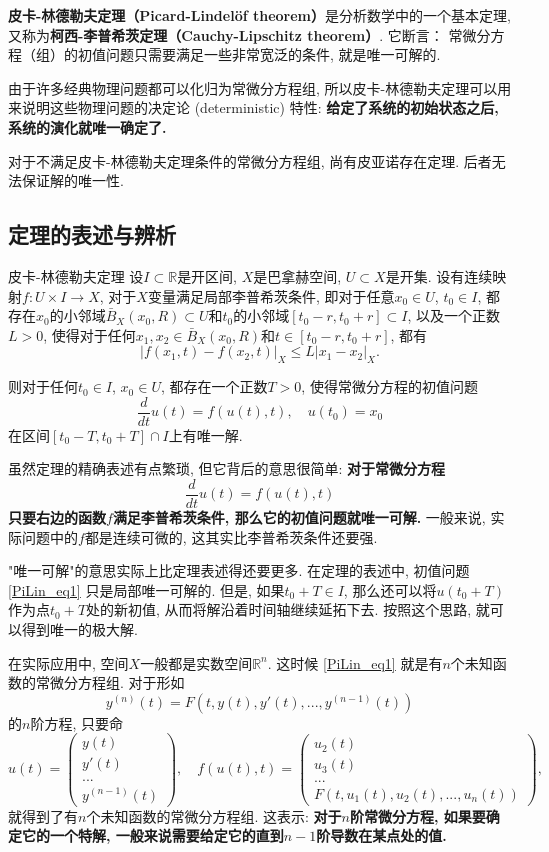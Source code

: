 
\textbf{皮卡-林德勒夫定理（Picard-Lindelöf theorem）}是分析数学中的一个基本定理, 又称为\textbf{柯西-李普希茨定理（Cauchy-Lipschitz theorem）}. 它断言： 常微分方程（组）的初值问题只需要满足一些非常宽泛的条件, 就是唯一可解的. 

由于许多经典物理问题都可以化归为常微分方程组, 所以皮卡-林德勒夫定理可以用来说明这些物理问题的决定论 (deterministic) 特性: \textbf{给定了系统的初始状态之后, 系统的演化就唯一确定了.}

对于不满足皮卡-林德勒夫定理条件的常微分方程组, 尚有皮亚诺存在定理. 后者无法保证解的唯一性.

\subsection{定理的表述与辨析}
\begin{theorem}{皮卡-林德勒夫定理}
设$I\subset\mathbb{R}$是开区间, $X$是巴拿赫空间, $U\subset X$是开集. 设有连续映射$f:U\times I\to X$, 对于$X$变量满足局部李普希茨条件, 即对于任意$x_0\in U$, $t_0\in I$, 都存在$x_0$的小邻域$\bar B_X(x_0,R)\subset U$和$t_0$的小邻域$[t_0-r,t_0+r]\subset I$, 以及一个正数$L>0$, 使得对于任何$x_1,x_2\in \bar B_X(x_0,R)$和$t\in[t_0-r,t_0+r]$, 都有
$$
|f(x_1,t)-f(x_2,t)|_X\leq L|x_1-x_2|_X.
$$

则对于任何$t_0\in I$, $x_0\in U$, 都存在一个正数$T>0$, 使得常微分方程的初值问题
$$
\frac{d}{dt}u(t)=f(u(t),t),\quad u(t_0)=x_0
$$
在区间$[t_0-T,t_0+T]\cap I$上有唯一解.
\end{theorem}

虽然定理的精确表述有点繁琐, 但它背后的意思很简单: \textbf{对于常微分方程}
\begin{equation}\label{PiLin_eq1}
\frac{d}{dt}u(t)=f(u(t),t)
\end{equation}
\textbf{只要右边的函数$f$满足李普希茨条件, 那么它的初值问题就唯一可解.} 一般来说, 实际问题中的$f$都是连续可微的, 这其实比李普希茨条件还要强.

"唯一可解"的意思实际上比定理表述得还要更多. 在定理的表述中, 初值问题 \autoref{PiLin_eq1} 只是局部唯一可解的. 但是, 如果$t_0+T\in I$, 那么还可以将$u(t_0+T)$作为点$t_0+T$处的新初值, 从而将解沿着时间轴继续延拓下去. 按照这个思路, 就可以得到唯一的极大解.

在实际应用中, 空间$X$一般都是实数空间$\mathbb{R}^n$. 这时候 \autoref{PiLin_eq1} 就是有$n$个未知函数的常微分方程组. 对于形如
$$
y^{(n)}(t)=F(t,y(t),y'(t),...,y^{(n-1)}(t))
$$
的$n$阶方程, 只要命
$$
u(t)=\left(\begin{array}{c}
y(t)\\
y'(t)\\
...\\
y^{(n-1)}(t)
\end{array}
\right),\quad
f(u(t),t)=\left(\begin{array}{c}
u_2(t)\\
u_3(t)\\
...\\
F\left(t,u_1(t),u_2(t),...,u_n(t)\right)
\end{array}
\right),
$$
就得到了有$n$个未知函数的常微分方程组. 这表示: \textbf{对于$n$阶常微分方程, 如果要确定它的一个特解, 一般来说需要给定它的直到$n-1$阶导数在某点处的值.}


